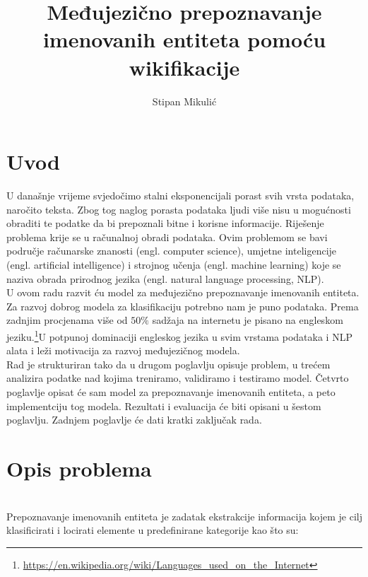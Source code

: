 \documentclass[times, utf8, seminar]{fer}
\begin{document}
\title{Međujezično prepoznavanje imenovanih entiteta pomoću wikifikacije}

\author{Stipan Mikulić}

\maketitle

\tableofcontents

\chapter{Uvod}
U današnje vrijeme svjedočimo stalni eksponencijali porast svih vrsta podataka, naročito teksta. Zbog tog naglog porasta podataka ljudi više nisu u mogućnosti obraditi te podatke da bi prepoznali bitne i korisne informacije. Riješenje problema krije se u računalnoj obradi podataka. 
Ovim problemom se bavi područje računarske znanosti (engl. computer science), umjetne inteligencije (engl. artificial intelligence) i strojnog učenja (engl. machine learning) koje se naziva obrada prirodnog jezika (engl. natural language processing, NLP). \\
\indent U ovom radu razvit ću model za međujezično prepoznavanje imenovanih entiteta. Za razvoj dobrog modela za klasifikaciju potrebno nam je puno podataka. Prema zadnjim procjenama više od $ 50\% $ sadžaja na internetu je pisano na engleskom jeziku.\footnote{\url{https://en.wikipedia.org/wiki/Languages_used_on_the_Internet}}U potpunoj dominaciji engleskog jezika u svim vrstama podataka i NLP alata i leži motivacija za razvoj međujezičnog modela. \\
\indent Rad je strukturiran tako da u drugom poglavlju opisuje problem, u trećem analizira podatke nad kojima treniramo, validiramo i testiramo model. Četvrto poglavlje opisat će sam model za prepoznavanje imenovanih entiteta, a peto implementciju tog modela. Rezultati i evaluacija će biti opisani u šestom poglavlju. Zadnjem poglavlje će dati kratki zaključak rada.
\chapter{Opis problema}
\citep{Ratinov:2009:DCM:1596374.1596399}
\citep{tjongkimsang2003conll}
\citep{DBLP:conf/conll/TsaiMR16}
\citep{tksintro2002conll}  \\
Prepoznavanje imenovanih entiteta je zadatak ekstrakcije informacija kojem je cilj klasificirati i locirati elemente u predefinirane kategorije kao što su:
\end{document}
